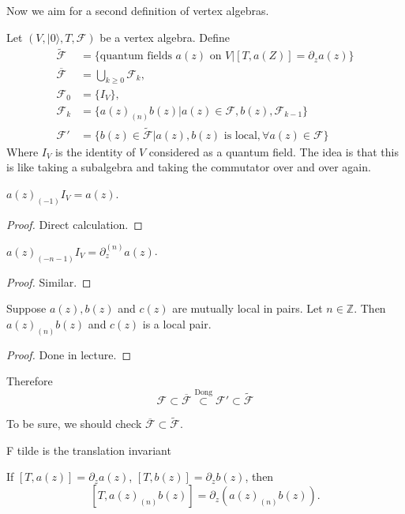\noindent
Now we aim for a second definition of vertex algebras.

Let $(V,|0\rangle,T,\mathcal{F})$ be a vertex algebra.
Define
\begin{align*}
\tilde{\mathcal{F}}&=\{\text{quantum fields $a(z)$ on $V$}
|[T,a(Z)]=\partial_za(z)\}\\
\overline{\mathcal{F}}&=\bigcup_{k\geq 0}\mathcal{F}_k,\\
\mathcal{F}_0&=\{I_V\},\\
\mathcal{F}_k&=\{a(z)_{(n)}b(z)|a(z)\in \mathcal{F},b(z),\mathcal{F}_{k-1}\}\\
\mathcal{F}'&=\{b(z) \in \tilde{\mathcal{F}}|a(z),b(z)\text{ is local},
\forall  a(z) \in \mathcal{F}\}
\end{align*}
Where $I_V$ is the identity of $V$ considered as a quantum field.
The idea is that this is like taking a subalgebra and taking
the commutator over and over again.

\begin{lemma}
\label{lemma-simple-lemma1}
$a(z)_{(-1)}I_V=a(z)$.
\end{lemma}

\begin{proof}
Direct calculation.
\end{proof}

\begin{lemma}
\label{lemma-simple-lemma2}
$a(z)_{(-n-1)}I_V=\partial_z^{(n)}a(z)$.
\end{lemma}

\begin{proof}
Similar.
\end{proof}

\begin{lemma}[Dong]
\label{lemma-Dong}
Suppose $a(z),b(z)$ and $c(z)$ are mutually local in pairs.
Let $n \in \mathbb{Z}$. Then $a(z)_{(n)}b(z)$ and $c(z)$
is a local pair.
\end{lemma}

\begin{proof}
Done in lecture.
\end{proof}

Therefore
$$
\mathcal{F} \subset \overline{\mathcal{F}}\overset{\text{Dong}}{\subset}
\mathcal{F}'\subset \tilde{\mathcal{F}}
$$
\begin{remark}
\label{remark-Fbar-subset-Ftilde}
To be sure, we should check $\overline{\mathcal{F}}\subset \tilde{\mathcal{F}}$.
\end{remark}

F tilde is the translation invariant
\begin{exercise}
\label{exercise-Fbar-subset-Ftilde}
If $[T,a(z)]=\partial_za(z)$, $[T,b(z)]=\partial_zb(z)$,
then
$$
[T,a(z)_{(n)}b(z)]=\partial_z(a(z)_{(n)}b(z)).
$$
\end{exercise}

